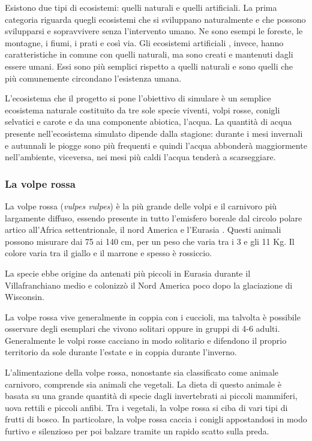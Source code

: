 \documentclass[11pt]{article}
\begin{document}
Esistono due tipi di ecosistemi: quelli naturali e quelli artificiali. La prima categoria riguarda quegli ecosistemi che si sviluppano naturalmente e che possono svilupparsi e sopravvivere senza l'intervento umano. Ne sono esempi le foreste, le montagne, i fiumi, i prati e così via. Gli ecosistemi artificiali \cite{ArtificialEcosystems}, invece, hanno caratteristiche in comune con quelli naturali, ma sono creati e mantenuti dagli essere umani. Essi sono più semplici rispetto a quelli naturali e sono quelli che più comunemente circondano l'esistenza umana. 

L'ecosistema che il progetto si pone l'obiettivo di simulare è un semplice ecosistema naturale costituito da tre sole specie viventi, volpi rosse, conigli selvatici e carote e da una componente abiotica, l'acqua. La quantità di acqua presente nell'ecosistema simulato dipende dalla stagione: durante i mesi invernali e autunnali le piogge sono più frequenti e quindi l'acqua abbonderà maggiormente nell'ambiente, viceversa, nei mesi più caldi l'acqua tenderà a scarseggiare. 

\subsubsection{La volpe rossa}
\label{volpe}
La volpe rossa (\emph{vulpes vulpes}) è la più grande delle volpi e il carnivoro più largamente diffuso, essendo presente in tutto l'emisfero boreale dal circolo polare artico all'Africa settentrionale, il nord America e l'Eurasia \cite{WikiVolpe}.
Questi animali possono misurare dai 75 ai 140 cm, per un peso che varia tra i 3 e gli 11 Kg. Il colore varia tra il giallo e il marrone e spesso è rossiccio. 

La specie ebbe origine da antenati più piccoli in Eurasia durante il Villafranchiano medio \cite{KurtenBjorn} e colonizzò il Nord America poco dopo la glaciazione di Wisconsin.\cite{Kurten1980Sep}

La volpe rossa vive generalmente in coppia con i cuccioli, ma talvolta è possibile osservare degli esemplari che vivono solitari oppure in gruppi di 4-6 adulti. Generalmente le volpi rosse cacciano in modo solitario e difendono il proprio territorio da sole durante l'estate e in coppia durante l'inverno. 

L'alimentazione della volpe rossa, nonostante sia classificato come animale carnivoro, comprende sia animali che vegetali. La dieta di questo animale è basata su una grande quantità di specie dagli invertebrati ai piccoli mammiferi, uova rettili e piccoli anfibi. Tra i vegetali, la volpe rossa si ciba di vari tipi di frutti di bosco. In particolare, la volpe rossa caccia i conigli appostandosi in modo furtivo e silenzioso per poi balzare tramite un rapido scatto sulla preda. 
\end{document}

